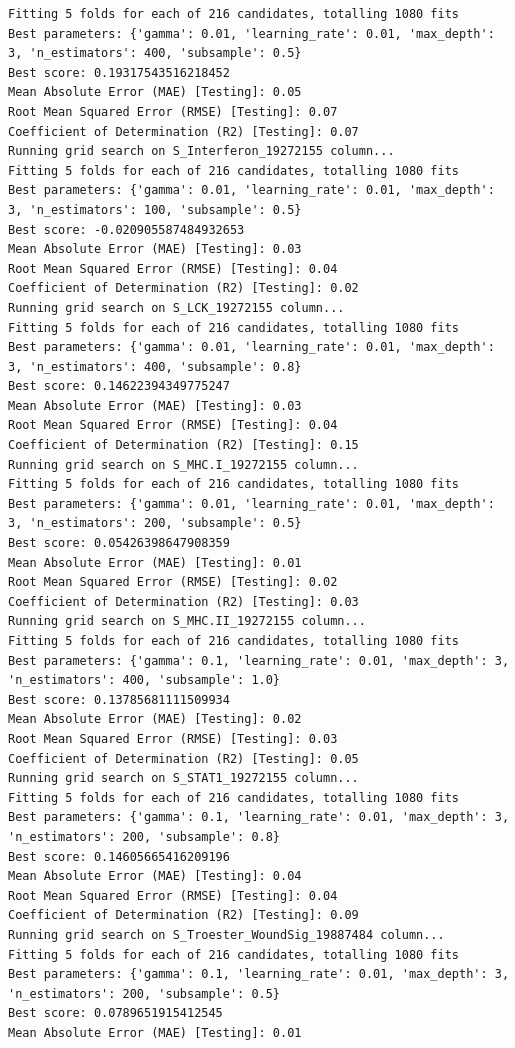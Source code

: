 \documentclass[
  letterpaper,
  DIV=11,
  numbers=noendperiod]{scrartcl}
\begin{document}
\begin{verbatim}
Fitting 5 folds for each of 216 candidates, totalling 1080 fits
Best parameters: {'gamma': 0.01, 'learning_rate': 0.01, 'max_depth': 3, 'n_estimators': 400, 'subsample': 0.5}
Best score: 0.19317543516218452
Mean Absolute Error (MAE) [Testing]: 0.05
Root Mean Squared Error (RMSE) [Testing]: 0.07
Coefficient of Determination (R2) [Testing]: 0.07
Running grid search on S_Interferon_19272155 column...
Fitting 5 folds for each of 216 candidates, totalling 1080 fits
Best parameters: {'gamma': 0.01, 'learning_rate': 0.01, 'max_depth': 3, 'n_estimators': 100, 'subsample': 0.5}
Best score: -0.020905587484932653
Mean Absolute Error (MAE) [Testing]: 0.03
Root Mean Squared Error (RMSE) [Testing]: 0.04
Coefficient of Determination (R2) [Testing]: 0.02
Running grid search on S_LCK_19272155 column...
Fitting 5 folds for each of 216 candidates, totalling 1080 fits
Best parameters: {'gamma': 0.01, 'learning_rate': 0.01, 'max_depth': 3, 'n_estimators': 400, 'subsample': 0.8}
Best score: 0.14622394349775247
Mean Absolute Error (MAE) [Testing]: 0.03
Root Mean Squared Error (RMSE) [Testing]: 0.04
Coefficient of Determination (R2) [Testing]: 0.15
Running grid search on S_MHC.I_19272155 column...
Fitting 5 folds for each of 216 candidates, totalling 1080 fits
Best parameters: {'gamma': 0.01, 'learning_rate': 0.01, 'max_depth': 3, 'n_estimators': 200, 'subsample': 0.5}
Best score: 0.05426398647908359
Mean Absolute Error (MAE) [Testing]: 0.01
Root Mean Squared Error (RMSE) [Testing]: 0.02
Coefficient of Determination (R2) [Testing]: 0.03
Running grid search on S_MHC.II_19272155 column...
Fitting 5 folds for each of 216 candidates, totalling 1080 fits
Best parameters: {'gamma': 0.1, 'learning_rate': 0.01, 'max_depth': 3, 'n_estimators': 400, 'subsample': 1.0}
Best score: 0.13785681111509934
Mean Absolute Error (MAE) [Testing]: 0.02
Root Mean Squared Error (RMSE) [Testing]: 0.03
Coefficient of Determination (R2) [Testing]: 0.05
Running grid search on S_STAT1_19272155 column...
Fitting 5 folds for each of 216 candidates, totalling 1080 fits
Best parameters: {'gamma': 0.1, 'learning_rate': 0.01, 'max_depth': 3, 'n_estimators': 200, 'subsample': 0.8}
Best score: 0.14605665416209196
Mean Absolute Error (MAE) [Testing]: 0.04
Root Mean Squared Error (RMSE) [Testing]: 0.04
Coefficient of Determination (R2) [Testing]: 0.09
Running grid search on S_Troester_WoundSig_19887484 column...
Fitting 5 folds for each of 216 candidates, totalling 1080 fits
Best parameters: {'gamma': 0.1, 'learning_rate': 0.01, 'max_depth': 3, 'n_estimators': 200, 'subsample': 0.5}
Best score: 0.0789651915412545
Mean Absolute Error (MAE) [Testing]: 0.01

\end{verbatim}
\end{document}
